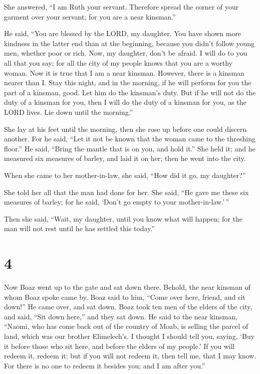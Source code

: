 She answered, ``I am Ruth your servant. Therefore spread the corner of
your garment over your servant; for you are a near kinsman.''

 He said, ``You are blessed by the LORD, my daughter. You
have shown more kindness in the latter end than at the beginning,
because you didn't follow young men, whether poor or rich.
 Now, my daughter, don't be afraid. I will do to you all
that you say; for all the city of my people knows that you are a worthy
woman.  Now it is true that I am a near kinsman. However,
there is a kinsman nearer than I.  Stay this night, and
in the morning, if he will perform for you the part of a kinsman, good.
Let him do the kinsman's duty. But if he will not do the duty of a
kinsman for you, then I will do the duty of a kinsman for you, as the
LORD lives. Lie down until the morning.''

 She lay at his feet until the morning, then she rose up
before one could discern another. For he said, ``Let it not be known
that the woman came to the threshing floor.''  He said,
``Bring the mantle that is on you, and hold it.'' She held it; and he
measured six measures of barley, and laid it on her; then he went into
the city.

 When she came to her mother-in-law, she said, ``How did
it go, my daughter?''

She told her all that the man had done for her.  She
said, ``He gave me these six measures of barley; for he said, `Don't go
empty to your mother-in-law.'\,''

 Then she said, ``Wait, my daughter, until you know what
will happen; for the man will not rest until he has settled this
today.''

\hypertarget{section-3}{%
\section{4}\label{section-3}}

 Now Boaz went up to the gate and sat down there. Behold,
the near kinsman of whom Boaz spoke came by. Boaz said to him, ``Come
over here, friend, and sit down!'' He came over, and sat down.
 Boaz took ten men of the elders of the city, and said,
``Sit down here,'' and they sat down.  He said to the near
kinsman, ``Naomi, who has come back out of the country of Moab, is
selling the parcel of land, which was our brother Elimelech's.
 I thought I should tell you, saying, `Buy it before those
who sit here, and before the elders of my people.' If you will redeem
it, redeem it; but if you will not redeem it, then tell me, that I may
know. For there is no one to redeem it besides you; and I am after
you.''

